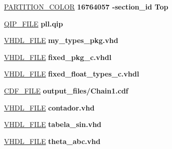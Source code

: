 \begin{DoxyCompactItemize}
\item 
\hyperlink{_d_e0___n_a_n_o___v_f_8qsf_a3d96d8db31443ed0dee438cee7b0ba8c}{P\+A\+R\+T\+I\+T\+I\+O\+N\+\_\+\+C\+O\+L\+O\+R} {\bfseries  \textcolor{vhdldigit}{16764057} \textcolor{vhdlchar}{ }\textcolor{vhdlchar}{-\/}\textcolor{vhdlchar}{section\+\_\+id}\textcolor{vhdlchar}{ }\textcolor{vhdlchar}{Top}\textcolor{vhdlchar}{ }} 
\item 
\hyperlink{_d_e0___n_a_n_o___v_f_8qsf_a42c036f7dc9bf25ac6352832625579f9}{Q\+I\+P\+\_\+\+F\+I\+L\+E} {\bfseries \textcolor{vhdlchar}{pll}\textcolor{vhdlchar}{.}\textcolor{vhdlchar}{qip}\textcolor{vhdlchar}{ }} 
\item 
\hyperlink{_d_e0___n_a_n_o___v_f_8qsf_a461ac1f66632f8729bf15b8660f7e07e}{V\+H\+D\+L\+\_\+\+F\+I\+L\+E} {\bfseries \textcolor{vhdlchar}{my\+\_\+types\+\_\+pkg}\textcolor{vhdlchar}{.}\textcolor{vhdlchar}{vhd}\textcolor{vhdlchar}{ }} 
\item 
\hyperlink{_d_e0___n_a_n_o___v_f_8qsf_a5d3721b435da4be0348a9324ddc7d8c0}{V\+H\+D\+L\+\_\+\+F\+I\+L\+E} {\bfseries \textcolor{vhdlchar}{fixed\+\_\+pkg\+\_\+c}\textcolor{vhdlchar}{.}\textcolor{vhdlchar}{vhdl}\textcolor{vhdlchar}{ }} 
\item 
\hyperlink{_d_e0___n_a_n_o___v_f_8qsf_abefe3c6bc16980ce54778dd579ba42c9}{V\+H\+D\+L\+\_\+\+F\+I\+L\+E} {\bfseries \textcolor{vhdlchar}{fixed\+\_\+float\+\_\+types\+\_\+c}\textcolor{vhdlchar}{.}\textcolor{vhdlchar}{vhdl}\textcolor{vhdlchar}{ }} 
\item 
\hyperlink{_d_e0___n_a_n_o___v_f_8qsf_a407c66e36d02ca6a228802badab8bcce}{C\+D\+F\+\_\+\+F\+I\+L\+E} {\bfseries \textcolor{vhdlchar}{output\+\_\+files}\textcolor{vhdlchar}{/}\textcolor{vhdlchar}{Chain1}\textcolor{vhdlchar}{.}\textcolor{vhdlchar}{cdf}\textcolor{vhdlchar}{ }} 
\item 
\hyperlink{_d_e0___n_a_n_o___v_f_8qsf_a8b05d656791b87aca7eba6637f765c99}{V\+H\+D\+L\+\_\+\+F\+I\+L\+E} {\bfseries \textcolor{vhdlchar}{contador}\textcolor{vhdlchar}{.}\textcolor{vhdlchar}{vhd}\textcolor{vhdlchar}{ }} 
\item 
\hyperlink{_d_e0___n_a_n_o___v_f_8qsf_a3ce82377938da50d565087c98da82aed}{V\+H\+D\+L\+\_\+\+F\+I\+L\+E} {\bfseries \textcolor{vhdlchar}{tabela\+\_\+sin}\textcolor{vhdlchar}{.}\textcolor{vhdlchar}{vhd}\textcolor{vhdlchar}{ }} 
\item 
\hyperlink{_d_e0___n_a_n_o___v_f_8qsf_a15c94ebc7d728860be7c411de20d4147}{V\+H\+D\+L\+\_\+\+F\+I\+L\+E} {\bfseries \textcolor{vhdlchar}{theta\+\_\+abc}\textcolor{vhdlchar}{.}\textcolor{vhdlchar}{vhd}\textcolor{vhdlchar}{ }} 

\end{DoxyCompactItemize}
